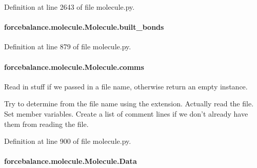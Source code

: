 Definition at line 2643 of file molecule.\-py.

\hypertarget{classforcebalance_1_1molecule_1_1Molecule_aeb5135f20e02b98900b6fa3fbab9822d}{
\paragraph[{built\-\_\-bonds}]{\setlength{\rightskip}{0pt plus 5cm}forcebalance.\-molecule.\-Molecule.\-built\-\_\-bonds}}\label{classforcebalance_1_1molecule_1_1Molecule_aeb5135f20e02b98900b6fa3fbab9822d}


Definition at line 879 of file molecule.\-py.

\hypertarget{classforcebalance_1_1molecule_1_1Molecule_adf9f25ebcf955be562ef186b822e237a}{
\paragraph[{comms}]{\setlength{\rightskip}{0pt plus 5cm}forcebalance.\-molecule.\-Molecule.\-comms}}\label{classforcebalance_1_1molecule_1_1Molecule_adf9f25ebcf955be562ef186b822e237a}


Read in stuff if we passed in a file name, otherwise return an empty instance. 

Try to determine from the file name using the extension. Actually read the file. Set member variables. Create a list of comment lines if we don't already have them from reading the file. 

Definition at line 900 of file molecule.\-py.

\hypertarget{classforcebalance_1_1molecule_1_1Molecule_a69c18c3fad45cd38102d9582445f5c6d}{
\paragraph[{Data}]{\setlength{\rightskip}{0pt plus 5cm}forcebalance.\-molecule.\-Molecule.\-Data}}\label{classforcebalance_1_1molecule_1_1Molecule_a69c18c3fad45cd38102d9582445f5c6d}


